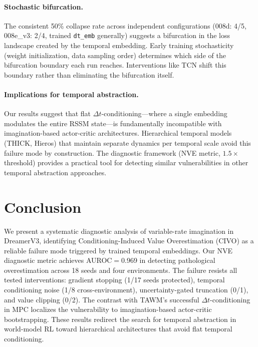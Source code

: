 \documentclass[letterpaper]{article}
\newcommand{\civo}{CIVO\xspace}
\newcommand{\nve}{NVE\xspace}
\newcommand{\dtemb}{\texttt{dt\_emb}\xspace}
\begin{document}
\paragraph{Stochastic bifurcation.}
The consistent 50\% collapse rate across independent configurations (008d: 4/5, 008e\_v3: 2/4, trained \dtemb generally) suggests a bifurcation in the loss landscape created by the temporal embedding. Early training stochasticity (weight initialization, data sampling order) determines which side of the bifurcation boundary each run reaches. Interventions like TCN shift this boundary rather than eliminating the bifurcation itself.

\paragraph{Implications for temporal abstraction.}
Our results suggest that flat $\Delta t$-conditioning---where a single embedding modulates the entire RSSM state---is fundamentally incompatible with imagination-based actor-critic architectures. Hierarchical temporal models (THICK, Hieros) that maintain separate dynamics per temporal scale avoid this failure mode by construction. The diagnostic framework (\nve metric, $1.5\times$ threshold) provides a practical tool for detecting similar vulnerabilities in other temporal abstraction approaches.

\section{Conclusion}

We present a systematic diagnostic analysis of variable-rate imagination in DreamerV3, identifying Conditioning-Induced Value Overestimation (\civo) as a reliable failure mode triggered by trained temporal embeddings. Our \nve diagnostic metric achieves AUROC$=$0.969 in detecting pathological overestimation across 18 seeds and four environments. The failure resists all tested interventions: gradient stopping (1/17 seeds protected), temporal conditioning noise (1/8 cross-environment), uncertainty-gated truncation (0/1), and value clipping (0/2). The contrast with TAWM's successful $\Delta t$-conditioning in MPC localizes the vulnerability to imagination-based actor-critic bootstrapping. These results redirect the search for temporal abstraction in world-model RL toward hierarchical architectures that avoid flat temporal conditioning.
\end{document}
